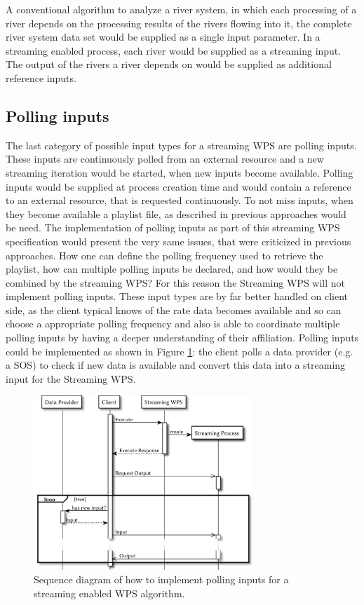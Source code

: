 			A conventional algorithm to analyze a river system, in which each processing of a river depends on the processing results of the rivers flowing into it, the complete river system data set would be supplied as a single input parameter. In a streaming enabled process, each river would be supplied as a streaming input. The output of the rivers a river depends on would be supplied as additional reference inputs.
		\subsection{Polling inputs}
			\label{sec:stream:input:polling}
			The last category of possible input types for a streaming \ac{WPS} are polling inputs. These inputs are continuously polled from an external resource and a new streaming iteration would be started, when new inputs become available. Polling inputs would be supplied at process creation time and would contain a reference to an external resource, that is requested continuously. To not miss inputs, when they become available a playlist file, as described in previous approaches \citep{foerster2012live} would be need. The implementation of polling inputs as part of this streaming \ac{WPS} specification would present the very same issues, that were criticized in previous approaches. How one can define the polling frequency used to retrieve the playlist, how can multiple polling inputs be declared, and how would they be combined by the streaming \ac{WPS}? For this reason the Streaming \ac{WPS} will not implement polling inputs. These input types are by far better handled on client side, as the client typical knows of the rate data becomes available and so can choose a appropriate polling frequency and also is able to coordinate multiple polling inputs by having a deeper understanding of their affiliation. Polling inputs could be implemented as shown in Figure \ref{fig:sd:polling}: the client polls a data provider (e.g. a \ac{SOS}) to check if new data is available and convert this data into a streaming input for the Streaming \ac{WPS}.
			\begin{figure}[!htb]
				\centering
				\includegraphics[width=0.73521126760563382\textwidth]{figures/sequence-diagramm-polling.pdf}
				\caption{\label{fig:sd:polling} Sequence diagram of how to implement polling inputs for a streaming enabled WPS algorithm.}
			\end{figure}

